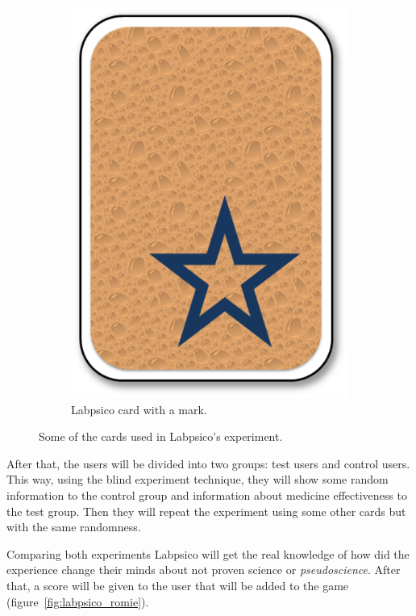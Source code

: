 \begin{figure}[!htbp]
\begin{subfigure}{0.4\textwidth}
		\includegraphics[height=0.3\textheight]{fig/manuals/trivial/labpsico/card2}
		\caption{Labpsico card with a mark.}\label{subfig:labpsico_card_mark}
	\end{subfigure}\quad
	\caption{Some of the cards used in Labpsico's experiment.}
\end{figure}

After that, the users will be divided into two groups: test users and control users. This way, using
the blind experiment technique, they will show some random information to the control group and
information about medicine effectiveness to the test group. Then they will repeat the experiment
using some other cards but with the same randomness.

Comparing both experiments Labpsico will get the real knowledge of how did the experience change
their minds about not proven science or \emph{pseudoscience}. After that, a score will be given to
the user that will be added to the game (figure~\ref{fig:labpsico_romie}).

